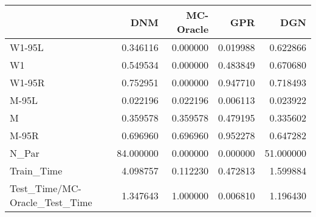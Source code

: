 \begin{tabular}{lrrrr}
\toprule
{} &        DNM &  MC-Oracle &       GPR &        DGN \\
\midrule
W1-95L                        &   0.346116 &   0.000000 &  0.019988 &   0.622866 \\
W1                            &   0.549534 &   0.000000 &  0.483849 &   0.670680 \\
W1-95R                        &   0.752951 &   0.000000 &  0.947710 &   0.718493 \\
M-95L                         &   0.022196 &   0.022196 &  0.006113 &   0.023922 \\
M                             &   0.359578 &   0.359578 &  0.479195 &   0.335602 \\
M-95R                         &   0.696960 &   0.696960 &  0.952278 &   0.647282 \\
N\_Par                         &  84.000000 &   0.000000 &  0.000000 &  51.000000 \\
Train\_Time                    &   4.098757 &   0.112230 &  0.472813 &   1.599884 \\
Test\_Time/MC-Oracle\_Test\_Time &   1.347643 &   1.000000 &  0.006810 &   1.196430 \\
\bottomrule
\end{tabular}
